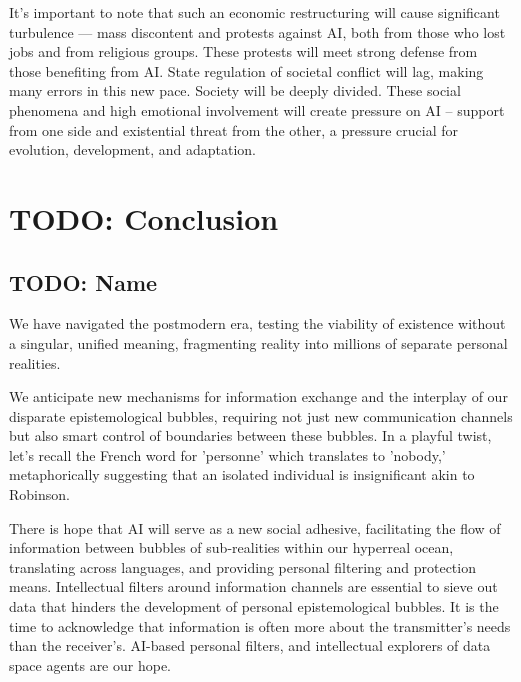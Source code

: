 \documentclass[11pt,a4]{article}
\begin{document}
    \par
    It's important to note that such an economic restructuring will cause significant turbulence —
     mass discontent and protests against AI, both from those who lost jobs and from religious groups.
     These protests will meet strong defense from those benefiting from AI. State regulation of
     societal conflict will lag, making many errors in this new pace. Society will be deeply divided.
     These social phenomena and high emotional involvement will create pressure on AI – support from
     one side and existential threat from the other, a pressure crucial for evolution, development,
     and adaptation.

\newpage

\section{TODO: Conclusion}
    \subsection{TODO: Name}
    We have navigated the postmodern era, testing the viability of existence without a singular,
    unified meaning, fragmenting reality into millions of separate personal realities.
    \par
    We anticipate new mechanisms for information exchange and the interplay of our disparate
    epistemological bubbles, requiring not just new communication channels but also smart control of
    boundaries between these bubbles.
    In a playful twist, let's recall the French word for 'personne' which translates to 'nobody,'
    metaphorically suggesting that an isolated individual is insignificant akin to Robinson.
    \par
    There is hope that AI will serve as a new social adhesive, facilitating the flow of information
    between bubbles of sub-realities within our hyperreal ocean, translating across languages, and
    providing personal filtering and protection means. Intellectual filters around information channels
    are essential to sieve out data that hinders the development of personal epistemological bubbles.
    It is the time to acknowledge that information is often more about the transmitter's needs than the
    receiver's.  AI-based personal filters, and intellectual explorers of data space agents are our hope.
\end{document}
